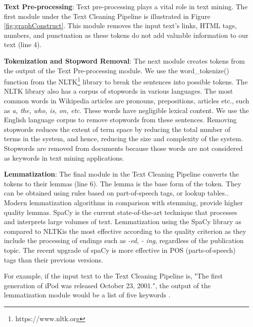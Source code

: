 \begin{sloppypar}
\textbf{Text Pre-processing}: Text pre-processing plays a vital role in text mining. The first module under the Text Cleaning Pipeline is illustrated in Figure \ref{fig:graphConstruct}. This module removes the input text's links, HTML tags, numbers, and punctuation as these tokens do not add valuable information to our text (line 4). 

\textbf{Tokenization and Stopword Removal}: The next module creates tokens from the output of the Text Pre-processing module. 
We use the word\_tokenize() function from the NLTK\footnote{{\label{nltk}}https://www.nltk.org} library to break the sentences into possible tokens. The NLTK library also has a corpus of stopwords in various languages. The most common words in Wikipedia articles are pronouns, prepositions, articles etc., such as \textit{a, the, who, is, on, etc}. These words have negligible lexical content. 
We use the English language corpus to remove stopwords from these sentences. Removing stopwords reduces the extent of term space by reducing the total number of terms in the system, and hence, reducing the size and complexity of the system. Stopwords are removed from documents because those words are not considered as keywords in text mining applications\cite{porter_1980}.

\textbf{Lemmatization}: The final module in the Text Cleaning Pipeline converts the tokens to their lemmas (line 6). The lemma is the base form of the token. They can be obtained using rules based on part-of-speech tags, or lookup tables.\cite{spacy}. Modern lemmatization algorithms in comparison with stemming, provide higher quality lemmas\cite{9467919}. SpaCy is the current state-of-the-art technique that processes and interprets large volumes of text. Lemmatization using the SpaCy library as compared to NLTK\footnotemark[\ref{nltk}] is the most effective according to the quality criterion as they include the processing of endings such as \textit{-ed, - ing}, regardless of the publication topic\cite{9467919}. The recent upgrade of spaCy is more effective in POS (parts-of-speech) tags than their previous versions\cite{spacy}. 

For example, if the input text to the Text Cleaning Pipeline is, "{\selectfont The first generation of iPod was released October 23, 2001.}", the output of the lemmatization module would be a list of five keywords {}.


\end{sloppypar}
